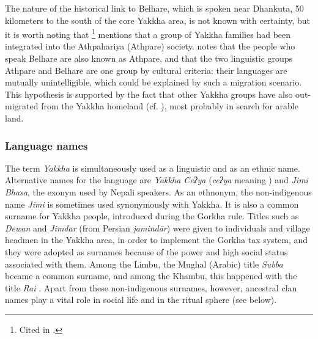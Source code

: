 The nature of the historical link to Belhare, which is spoken near Dhankuta, 50 kilometers to the  south of the core Yakkha area, is not known with certainty, but it is worth noting that \citet[13, 47]{Dahal1985An-ethnographic}\footnote{Cited in \citet[1]{Russell1992_Yakha}.} mentions that a group of Yakkha families had been integrated into the Athpahariya (Athpare) society. \citet[21]{Bickel1996Aspect} notes that the people who speak Belhare are also known as Athpare, and that the two linguistic groups Athpare and Belhare are one group  by cultural criteria: their languages are mutually unintelligible, which could be explained by such a migration scenario. This hypothesis is supported by the fact that other Yakkha groups have also out-migrated from the Yakkha homeland (cf. ), most probably in search for arable land.


\subsubsection{Language names}

The term \emph{Yakkha} is simultaneously used as a linguistic and as an ethnic name. Alternative names for the language are \emph{Yakkha Ceʔya} (\emph{ceʔya} meaning ) and \emph{Jimi Bhasa}, the exonym used by Nepali speakers.  As an ethnonym, the non-indigenous name \emph{Jimi}  is  sometimes used synonymously with Yakkha. It is also a common surname for Yakkha people, introduced during the Gorkha rule. Titles such as \emph{Dewan} and \emph{Jimdar} (from Persian \emph{jamindār}) were given to individuals  and village headmen in the Yakkha area, in order to implement the Gorkha tax system, and they were adopted as surnames because of the power and high social status associated with them. Among the Limbu, the Mughal (Arabic) title \emph{Subba} became a common surname, and among the Khambu, this happened with the title \emph{Rai}  \citep[51]{Whelpton2005A-History}. Apart from these non-indigenous surnames, however, ancestral clan names play a vital role in social life and in the ritual sphere (see  below).  

